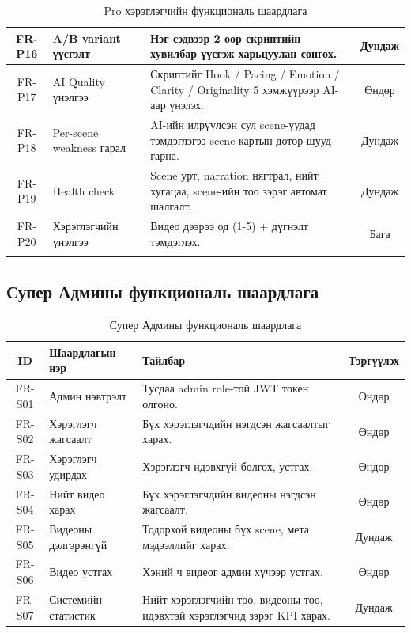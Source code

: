 \begin{longtable}{|c|p{3.2cm}|p{6cm}|c|}
\hline
FR-P16 & A/B variant үүсгэлт & Нэг сэдвээр 2 өөр скриптийн хувилбар үүсгэж харьцуулан сонгох. & Дундаж \\
\hline
FR-P17 & AI Quality үнэлгээ & Скриптийг Hook / Pacing / Emotion / Clarity / Originality 5 хэмжүүрээр AI-аар үнэлэх. & Өндөр \\
\hline
FR-P18 & Per-scene weakness гарал & AI-ийн илрүүлсэн сул scene-уудад тэмдэглэгээ scene картын дотор шууд гарна. & Дундаж \\
\hline
FR-P19 & Health check & Scene урт, narration нягтрал, нийт хугацаа, scene-ийн тоо зэрэг автомат шалгалт. & Дундаж \\
\hline
FR-P20 & Хэрэглэгчийн үнэлгээ & Видео дээрээ од (1-5) + дүгнэлт тэмдэглэх. & Бага \\
\hline
\caption{Pro хэрэглэгчийн функциональ шаардлага} \label{tab:fr_pro}
\end{longtable}

\subsection{Супер Админы функциональ шаардлага}

\begin{table}[H]
\centering
\label{tab:fr_admin}
\small
\begin{tabular}{|c|p{3.2cm}|p{6cm}|c|}
\hline
\textbf{ID} & \textbf{Шаардлагын нэр} & \textbf{Тайлбар} & \textbf{Тэргүүлэх} \\
\hline
FR-S01 & Админ нэвтрэлт & Тусдаа admin role-той JWT токен олгоно. & Өндөр \\
\hline
FR-S02 & Хэрэглэгч жагсаалт & Бүх хэрэглэгчдийн нэгдсэн жагсаалтыг харах. & Өндөр \\
\hline
FR-S03 & Хэрэглэгч удирдах & Хэрэглэгч идэвхгүй болгох, устгах. & Өндөр \\
\hline
FR-S04 & Нийт видео харах & Бүх хэрэглэгчдийн видеоны нэгдсэн жагсаалт. & Өндөр \\
\hline
FR-S05 & Видеоны дэлгэрэнгүй & Тодорхой видеоны бүх scene, мета мэдээллийг харах. & Дундаж \\
\hline
FR-S06 & Видео устгах & Хэний ч видеог админ хүчээр устгах. & Өндөр \\
\hline
FR-S07 & Системийн статистик & Нийт хэрэглэгчийн тоо, видеоны тоо, идэвхтэй хэрэглэгчид зэрэг KPI харах. & Дундаж \\
\hline
\end{tabular}
\caption{Супер Админы функциональ шаардлага}
\end{table}

